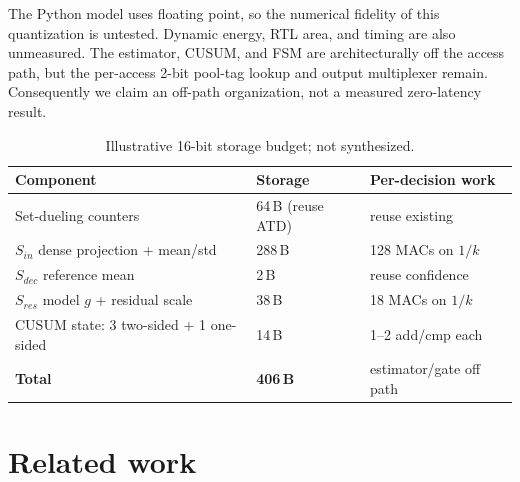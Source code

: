 \documentclass{article}
\begin{document}
The Python model uses floating point, so the numerical fidelity of this
quantization is untested. Dynamic energy, RTL area, and timing are also unmeasured.
The estimator, CUSUM, and FSM are architecturally off the access path, but the
per-access 2-bit pool-tag lookup and output multiplexer remain. Consequently we
claim an off-path organization, not a measured zero-latency result.

\begin{table}[t]\centering\footnotesize
\caption{Illustrative 16-bit storage budget; not synthesized.}
\label{tab:overhead}
\begin{tabular}{@{}lll@{}}
\toprule
Component & Storage & Per-decision work\\
\midrule
Set-dueling counters & 64\,B (reuse ATD) & reuse existing\\
$S_{in}$ dense projection + mean/std & 288\,B & 128 MACs on $1/k$\\
$S_{dec}$ reference mean & 2\,B & reuse confidence\\
$S_{res}$ model $g$ + residual scale & 38\,B & 18 MACs on $1/k$\\
CUSUM state: 3 two-sided + 1 one-sided & 14\,B & 1--2 add/cmp each\\
\midrule
\textbf{Total} & \textbf{406\,B} & estimator/gate off path\\
\bottomrule
\end{tabular}
\end{table}

\section{Related work}\label{sec:related}

\end{document}
